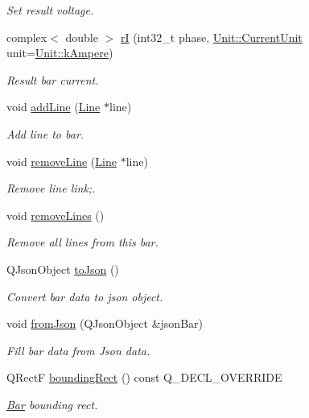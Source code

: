 \begin{DoxyCompactItemize}
\begin{DoxyCompactList}\small\item\em Set result voltage. \end{DoxyCompactList}\item 
complex$<$ double $>$ \hyperlink{group___models_ga8a009531f01430aa68eba739bb0dc2ea}{r\+I} (int32\+\_\+t phase, \hyperlink{class_unit_a0794cf6c9682f48296dd4a5315389787}{Unit\+::\+Current\+Unit} unit=\hyperlink{class_unit_a0794cf6c9682f48296dd4a5315389787a368a3c470f0b590a6100dda717a7dd4f}{Unit\+::k\+Ampere})
\begin{DoxyCompactList}\small\item\em Result bar current. \end{DoxyCompactList}\item 
void \hyperlink{group___models_ga8cbd2f62d92e69ce6c8d561b682464b6}{add\+Line} (\hyperlink{class_line}{Line} $\ast$line)
\begin{DoxyCompactList}\small\item\em Add line to bar. \end{DoxyCompactList}\item 
void \hyperlink{group___models_ga2536c0e5cb97fb627b3520826ece2c99}{remove\+Line} (\hyperlink{class_line}{Line} $\ast$line)
\begin{DoxyCompactList}\small\item\em Remove line link;. \end{DoxyCompactList}\item 
void \hyperlink{group___models_ga4ea1a2074cb45968d80d6add571884a4}{remove\+Lines} ()
\begin{DoxyCompactList}\small\item\em Remove all lines from this bar. \end{DoxyCompactList}\item 
Q\+Json\+Object \hyperlink{group___models_ga3eb84c42b687db6cd98e11b8bd38c86e}{to\+Json} ()
\begin{DoxyCompactList}\small\item\em Convert bar data to json object. \end{DoxyCompactList}\item 
void \hyperlink{group___models_ga1df62f03dd3a066ceaf6588ba6bb6004}{from\+Json} (Q\+Json\+Object \&json\+Bar)
\begin{DoxyCompactList}\small\item\em Fill bar data from Json data. \end{DoxyCompactList}\item 
Q\+Rect\+F \hyperlink{group___models_ga8279d8109019cc7e139e2023690496be}{bounding\+Rect} () const Q\+\_\+\+D\+E\+C\+L\+\_\+\+O\+V\+E\+R\+R\+I\+D\+E
\begin{DoxyCompactList}\small\item\em \hyperlink{class_bar}{Bar} bounding rect. \end{DoxyCompactList}\end{DoxyCompactItemize}
